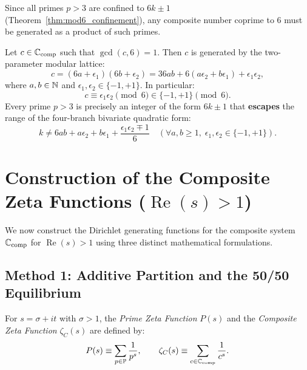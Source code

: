 Since all primes $p > 3$ are confined to $6k \pm 1$ (Theorem~\ref{thm:mod6_confinement}), any composite number coprime to $6$ must be generated as a product of such primes.

\begin{proposition}
\label{prop:composite_lattice}
\leanok
Let $c \in \mathbb{C}_{\mathrm{comp}}$ such that $\gcd(c, 6) = 1$. Then $c$ is generated by the two-parameter modular lattice:
\begin{equation}
\label{eq:lattice_eq}
c = (6a + \epsilon_1)(6b + \epsilon_2) = 36 a b + 6(a \epsilon_2 + b \epsilon_1) + \epsilon_1 \epsilon_2,
\end{equation}
where $a, b \in \mathbb{N}$ and $\epsilon_1, \epsilon_2 \in \{-1, +1\}$.
In particular:
\begin{equation}
c \equiv \epsilon_1 \epsilon_2 \pmod 6 \in \{-1, +1\} \pmod 6.
\end{equation}
Every prime $p > 3$ is precisely an integer of the form $6k \pm 1$ that \textbf{escapes} the range of the four-branch bivariate quadratic form:
\begin{equation}
k \neq 6 a b + a \epsilon_2 + b \epsilon_1 + \frac{\epsilon_1 \epsilon_2 \mp 1}{6} \quad (\forall a, b \ge 1, \; \epsilon_1, \epsilon_2 \in \{-1, +1\}).
\end{equation}
\end{proposition}

\section{Construction of the Composite Zeta Functions (\texorpdfstring{$\operatorname{Re}(s) > 1$}{Re(s) > 1})}
\label{sec:construction_composite_zeta}

We now construct the Dirichlet generating functions for the composite system $\mathbb{C}_{\mathrm{comp}}$ for $\operatorname{Re}(s) > 1$ using three distinct mathematical formulations.

\subsection{Method 1: Additive Partition and the 50/50 Equilibrium}

\begin{definition}
\label{def:P_and_zetaC}
\leanok
For $s = \sigma + i t$ with $\sigma > 1$, the \emph{Prime Zeta Function} $P(s)$ and the \emph{Composite Zeta Function} $\zeta_C(s)$ are defined by:
\begin{equation}
\label{eq:P_and_zetaC}
P(s) \equiv \sum_{p \in \mathbb{P}} \frac{1}{p^s}, \qquad \zeta_C(s) \equiv \sum_{c \in \mathbb{C}_{\mathrm{comp}}} \frac{1}{c^s}.
\end{equation}
\end{definition}

